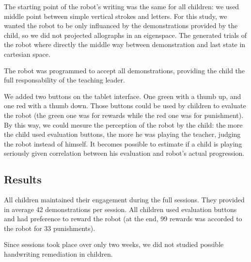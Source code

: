 \documentclass{sig-alternate}
\begin{document}
The starting point of the robot's writing was the same for all children: we
used middle point between simple vertical strokes and letters. For this study,
we wanted the robot to be only influanced by the demonstrations provided by the
child, so we did not projected allographs in an eigenspace. The generated
trials of the robot where directly the middle way between demonstration and
last state in cartesian space. 

The robot was programmed to accept all demonstrations, providing the child the
full responsability of the teaching leader.

We added two buttons on the tablet  interface. One green with a thumb up, and
one red with a thumb down. Those buttons could be used by children to evaluate the
robot (the green one was for rewards while the red one was for punishment). By
this way, we could mesure the perception of
the robot by the child: the more the child used evaluation buttons, the more he
was playing the teacher, judging the robot instead of himself. It becomes
possible to estimate if a child is playing seriously given correlation between
his evaluation and robot's actual progression.


\subsection{Results}

All children maintained their engagement during the full sessions. They provided
in average 42 demonstrations per session. All children used evaluation buttons and
had preference to reward the robot (at the end, 99 rewards was accorded to the
robot for 33 punishments). 

Since sessions took place over only two weeks, we did not studied possible
handwriting remediation in children. 
\end{document}
